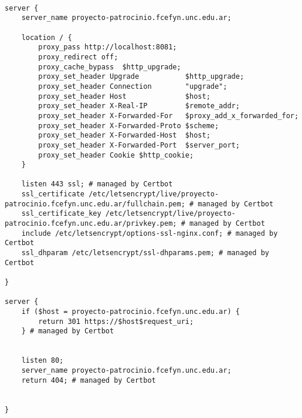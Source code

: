 \begin{lstlisting}[caption={Configuración de Nginx en el Servidor}, label={cod:nginx}, captionpos=b]

server {
    server_name proyecto-patrocinio.fcefyn.unc.edu.ar;

    location / {
        proxy_pass http://localhost:8081;
        proxy_redirect off;
        proxy_cache_bypass  $http_upgrade;
        proxy_set_header Upgrade           $http_upgrade;
        proxy_set_header Connection        "upgrade";
        proxy_set_header Host              $host;
        proxy_set_header X-Real-IP         $remote_addr;
        proxy_set_header X-Forwarded-For   $proxy_add_x_forwarded_for;
        proxy_set_header X-Forwarded-Proto $scheme;
        proxy_set_header X-Forwarded-Host  $host;
        proxy_set_header X-Forwarded-Port  $server_port;
        proxy_set_header Cookie $http_cookie;
    }

    listen 443 ssl; # managed by Certbot
    ssl_certificate /etc/letsencrypt/live/proyecto-patrocinio.fcefyn.unc.edu.ar/fullchain.pem; # managed by Certbot
    ssl_certificate_key /etc/letsencrypt/live/proyecto-patrocinio.fcefyn.unc.edu.ar/privkey.pem; # managed by Certbot
    include /etc/letsencrypt/options-ssl-nginx.conf; # managed by Certbot
    ssl_dhparam /etc/letsencrypt/ssl-dhparams.pem; # managed by Certbot

}

server {
    if ($host = proyecto-patrocinio.fcefyn.unc.edu.ar) {
        return 301 https://$host$request_uri;
    } # managed by Certbot


    listen 80;
    server_name proyecto-patrocinio.fcefyn.unc.edu.ar;
    return 404; # managed by Certbot


}
\end{lstlisting}